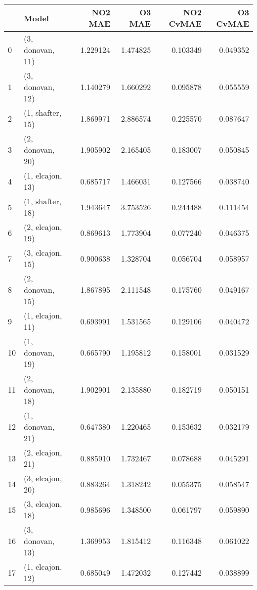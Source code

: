 \begin{tabular}{llrrrr}
\toprule
{} &             Model &   NO2 MAE &    O3 MAE &  NO2 CvMAE &  O3 CvMAE \\
\midrule
0  &  (3, donovan, 11) &  1.229124 &  1.474825 &   0.103349 &  0.049352 \\
1  &  (3, donovan, 12) &  1.140279 &  1.660292 &   0.095878 &  0.055559 \\
2  &  (1, shafter, 15) &  1.869971 &  2.886574 &   0.225570 &  0.087647 \\
3  &  (2, donovan, 20) &  1.905902 &  2.165405 &   0.183007 &  0.050845 \\
4  &  (1, elcajon, 13) &  0.685717 &  1.466031 &   0.127566 &  0.038740 \\
5  &  (1, shafter, 18) &  1.943647 &  3.753526 &   0.244488 &  0.111454 \\
6  &  (2, elcajon, 19) &  0.869613 &  1.773904 &   0.077240 &  0.046375 \\
7  &  (3, elcajon, 15) &  0.900638 &  1.328704 &   0.056704 &  0.058957 \\
8  &  (2, donovan, 15) &  1.867895 &  2.111548 &   0.175760 &  0.049167 \\
9  &  (1, elcajon, 11) &  0.693991 &  1.531565 &   0.129106 &  0.040472 \\
10 &  (1, donovan, 19) &  0.665790 &  1.195812 &   0.158001 &  0.031529 \\
11 &  (2, donovan, 18) &  1.902901 &  2.135880 &   0.182719 &  0.050151 \\
12 &  (1, donovan, 21) &  0.647380 &  1.220465 &   0.153632 &  0.032179 \\
13 &  (2, elcajon, 21) &  0.885910 &  1.732467 &   0.078688 &  0.045291 \\
14 &  (3, elcajon, 20) &  0.883264 &  1.318242 &   0.055375 &  0.058547 \\
15 &  (3, elcajon, 18) &  0.985696 &  1.348500 &   0.061797 &  0.059890 \\
16 &  (3, donovan, 13) &  1.369953 &  1.815412 &   0.116348 &  0.061022 \\
17 &  (1, elcajon, 12) &  0.685049 &  1.472032 &   0.127442 &  0.038899 \\
\bottomrule
\end{tabular}
